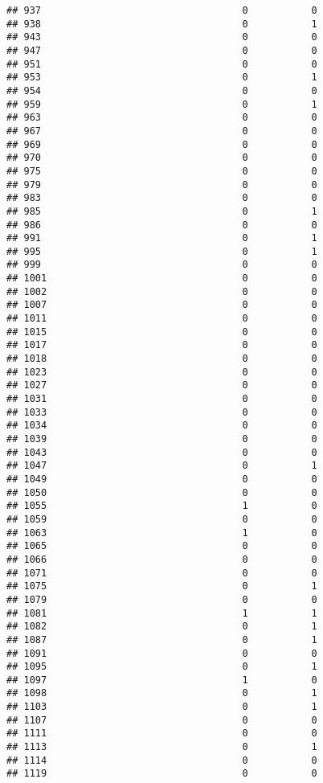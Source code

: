 \documentclass[
]{article}
\begin{document}
\begin{verbatim}
## 937                                   0           0
## 938                                   0           1
## 943                                   0           0
## 947                                   0           0
## 951                                   0           0
## 953                                   0           1
## 954                                   0           0
## 959                                   0           1
## 963                                   0           0
## 967                                   0           0
## 969                                   0           0
## 970                                   0           0
## 975                                   0           0
## 979                                   0           0
## 983                                   0           0
## 985                                   0           1
## 986                                   0           0
## 991                                   0           1
## 995                                   0           1
## 999                                   0           0
## 1001                                  0           0
## 1002                                  0           0
## 1007                                  0           0
## 1011                                  0           0
## 1015                                  0           0
## 1017                                  0           0
## 1018                                  0           0
## 1023                                  0           0
## 1027                                  0           0
## 1031                                  0           0
## 1033                                  0           0
## 1034                                  0           0
## 1039                                  0           0
## 1043                                  0           0
## 1047                                  0           1
## 1049                                  0           0
## 1050                                  0           0
## 1055                                  1           0
## 1059                                  0           0
## 1063                                  1           0
## 1065                                  0           0
## 1066                                  0           0
## 1071                                  0           0
## 1075                                  0           1
## 1079                                  0           0
## 1081                                  1           1
## 1082                                  0           1
## 1087                                  0           1
## 1091                                  0           0
## 1095                                  0           1
## 1097                                  1           0
## 1098                                  0           1
## 1103                                  0           1
## 1107                                  0           0
## 1111                                  0           0
## 1113                                  0           1
## 1114                                  0           0
## 1119                                  0           0
\end{verbatim}
\end{document}
